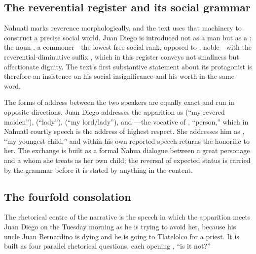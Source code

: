 \subsection{The reverential register and its social grammar}

Nahuatl marks reverence morphologically, and the text uses that
machinery to construct a precise social world. Juan Diego is
introduced not as a man but as a : the noun
, a commoner---the lowest free social rank, opposed
to , noble---with the reverential-diminutive suffix
, which in this register conveys not smallness but
affectionate dignity. The text's first substantive statement about
its protagonist is therefore an insistence on his social
insignificance and his worth in the same word.

The forms of address between the two speakers are equally exact and
run in opposite directions. Juan Diego addresses the apparition as
 (``my revered maiden''), 
(``lady''),  (``my lord/lady''), and
---the vocative of , ``person,''
which in Nahuatl courtly speech is the address of highest respect.
She addresses him as , ``my youngest child,'' and
 within his own reported speech returns the
honorific to her. The exchange is built as a formal Nahua dialogue
between a great personage and a  whom she treats as
her own child; the reversal of expected status is carried by the
grammar before it is stated by anything in the
content.

\subsection{The fourfold consolation}

The rhetorical centre of the narrative is the speech in which the
apparition meets Juan Diego on the Tuesday morning as he is trying to
avoid her, because his uncle Juan Bernardino is dying and he is
going to Tlatelolco for a priest. It is built as four parallel
rhetorical questions, each opening , ``is it not?''


